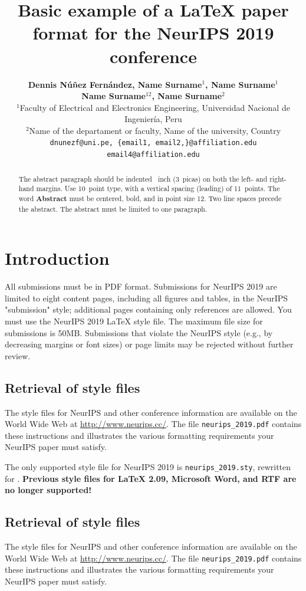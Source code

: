 \documentclass{article}
\title{Basic example of a LaTeX paper format for the NeurIPS 2019 conference}
\author{
  \textbf{Dennis Núñez Fernández, Name Surname$^{1}$, Name Surname$^{1}$} \\ 
  \textbf{Name Surname$^{12}$, Name Surname$^{2}$} \\
  $^{1}$Faculty of Electrical and Electronics Engineering, Universidad Nacional de Ingeniería, Peru \\ 
  $^{2}$Name of the departament or faculty, Name of the university, Country \\
  \texttt{dnunezf@uni.pe, \{email1, email2,\}@affiliation.edu} \\
  \texttt{email4@affiliation.edu} 
}
\begin{document}
\maketitle

\begin{abstract}
The abstract paragraph should be indented ~inch (3~picas) on both the left- and right-hand margins. Use 10~point type, with a vertical spacing (leading) of 11~points.  The word \textbf{Abstract} must be centered, bold, and in point size 12. Two line spaces precede the abstract. The abstract must be limited to one paragraph.
\end{abstract}


\section{Introduction}

All submissions must be in PDF format. Submissions for NeurIPS 2019 are limited to eight content pages, including all figures and tables, in the NeurIPS "submission" style; additional pages containing only references are allowed. You must use the NeurIPS 2019 LaTeX style file. The maximum file size for submissions is 50MB. Submissions that violate the NeurIPS style (e.g., by decreasing margins or font sizes) or page limits may be rejected without further review. 


\subsection{Retrieval of style files}

The style files for NeurIPS and other conference information are available on the World Wide Web at  \url{http://www.neurips.cc/}. The file \verb+neurips_2019.pdf+ contains these instructions and illustrates the various formatting requirements your NeurIPS paper must satisfy.

The only supported style file for NeurIPS 2019 is \verb+neurips_2019.sty+, rewritten for \LaTeXe{}. \textbf{Previous style files for \LaTeX{} 2.09,  Microsoft Word, and RTF are no longer supported!}


\subsection{Retrieval of style files}

The style files for NeurIPS and other conference information are available on the World Wide Web at  \url{http://www.neurips.cc/}. The file \verb+neurips_2019.pdf+ contains these instructions and illustrates the various formatting requirements your NeurIPS paper must satisfy.
\end{document}
